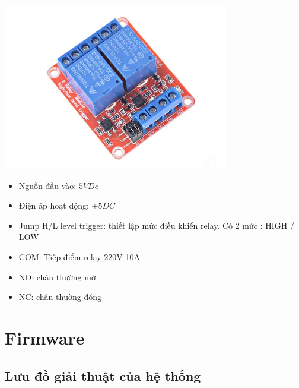 \begin{itemize}[label=-]
		\begin{minipage}{0.3\linewidth}
			\includegraphics[width=\linewidth]{./picture/relay_2kenh.png}
		\end{minipage}
		\begin{minipage}{0.7\linewidth}		
			\begin{itemize}[label = -]
				\item Nguồn đầu vào: $5VDc$
				\item Điện áp hoạt động: $+5DC$
				\item Jump H/L level trigger: thiết lập mức điều khiển relay. Có 2 mức : HIGH / LOW
				\item COM: Tiếp điểm relay 220V 10A
				\item NO: chân thường mở
				\item NC: chân thường đóng
			\end{itemize}
		\end{minipage}
	\end{itemize}
	
\section{Firmware}

\subsection{Lưu đồ giải thuật của hệ thống}

